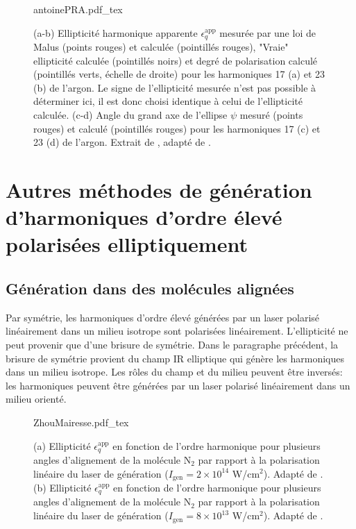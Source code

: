\begin{figure}
\centering
\def\svgwidth{\textwidth}
{antoinePRA.pdf_tex}
\caption{(a-b) Ellipticité harmonique apparente $\epsilon_q^{\text{app}}$ mesurée par une loi de Malus (points rouges) et calculée (pointillés rouges), "Vraie" ellipticité calculée (pointillés noirs) et degré de polarisation calculé (pointillés verts, échelle de droite) pour les harmoniques 17 (a) et 23 (b) de l'argon. Le signe de l'ellipticité mesurée n'est pas possible à déterminer ici, il est donc choisi identique à celui de l'ellipticité calculée. (c-d) Angle du grand axe de l'ellipse $\psi$ mesuré (points rouges) et calculé (pointillés rouges) pour les harmoniques 17 (c) et 23 (d) de l'argon. Extrait de , adapté de .}
\label{fig:Antoine}
\end{figure}

\section{Autres méthodes de génération d'harmoniques d'ordre élevé polarisées elliptiquement}
\subsection{Génération dans des molécules alignées}
Par symétrie, les harmoniques d'ordre élevé générées par un laser polarisé linéairement dans un milieu isotrope sont polarisées linéairement. L'ellipticité ne peut provenir que d'une brisure de symétrie. Dans le paragraphe précédent, la brisure de symétrie provient du champ IR elliptique qui génère les harmoniques dans un milieu isotrope. Les rôles du champ et du milieu peuvent être inversés: les harmoniques peuvent être générées par un laser polarisé linéairement dans un milieu orienté.

\begin{figure}[ht]
\centering
\def\svgwidth{\textwidth}
{ZhouMairesse.pdf_tex}
\caption{(a) Ellipticité $\epsilon_q^{\text{app}}$ en fonction de l'ordre harmonique pour plusieurs angles d'alignement de la molécule N$_2$ par rapport à la polarisation linéaire du laser de génération ($I_{\text{gen}} = 2 \times 10^{14}$ W/cm$^2$). Adapté de . (b) Ellipticité $\epsilon_q^{\text{app}}$ en fonction de l'ordre harmonique pour plusieurs angles d'alignement de la molécule N$_2$ par rapport à la polarisation linéaire du laser de génération ($I_{\text{gen}} = 8 \times 10^{13}$ W/cm$^2$). Adapté de .}
\label{fig:ZhouMairesse}
\end{figure}

